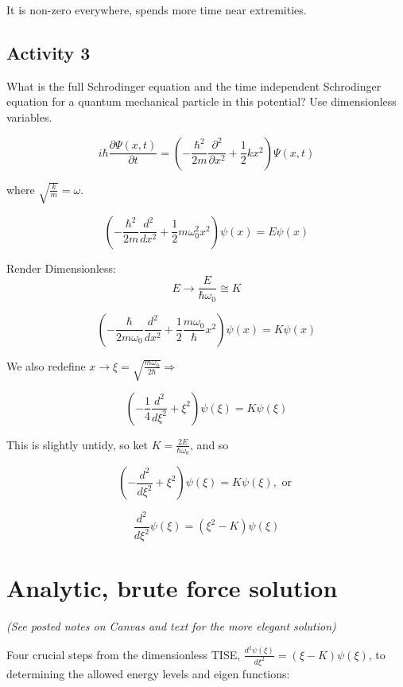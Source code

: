 \documentclass{article}
\begin{document}
It is non-zero everywhere, spends more time near extremities. 


\subsection{Activity 3}

What is the full Schrodinger equation and the time independent Schrodinger equation for a quantum mechanical particle in this potential? Use dimensionless variables. 

$$i \hbar \frac{\partial \Psi(x,t)}{\partial t} = \left( - \frac{\hbar^2}{2m} \frac{\partial^2}{\partial x^2} + \frac{1}{2} kx^2 \right) \Psi(x,t)$$

where $\sqrt{\frac{k}{m}} = \omega$. 

$$\left(-\frac{\hbar^{2}}{2 m} \frac{d^{2}}{d x^{2}}+\frac{1}{2} m \omega_{0}^{2} x^{2}\right) \psi(x)=E \psi(x)$$


Render Dimensionless: $$E \rightarrow  \frac{E}{\hbar \omega_{0}} \cong K $$


$$\left(-\frac{\hbar}{2 m \omega_{0}} \frac{d^{2}}{d x^{2}}+\frac{1}{2} \frac{m \omega_{0}}{\hbar} x^{2}\right) \psi(x) = K \psi(x)$$

We also redefine $x \rightarrow \xi = \sqrt{\frac{m \omega_0}{2 \hbar}} \Rightarrow$

$$\left( - \frac{1}{4} \frac{d^2}{d \xi^2} + \xi^2 \right) \psi(\xi) = K \psi(\xi)$$

This is slightly untidy, so ket $K = \frac{2E}{\hbar \omega_0}$, and so

$$\left(- \frac{d^2}{d \xi^2} + \xi^2 \right) \psi(\xi) = K \psi(\xi), \text{ or }$$

$$\frac{d^2}{d \xi^2} \psi(\xi) = \left(\xi^2 - K \right) \psi(\xi)$$



\section{Analytic, brute force solution}

\textit{(See posted notes on Canvas and text for the more elegant solution)}

Four crucial steps from the dimensionless TISE, $\frac{d^2 \psi(\xi)}{d \xi^2} = (\xi - K) \psi(\xi)$, to determining the allowed energy levels and eigen functions:
\end{document}
